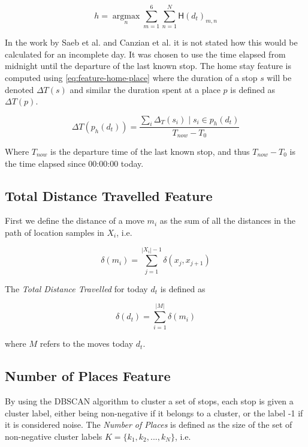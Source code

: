 \begin{equation}
\label{eq:feature-home-place}
h = \operatorname*{argmax}_n \sum_{m=1}^{6} \sum_{n=1}^{N}  \mathsf{H}(d_t)_{m,n}
\end{equation}

In the work by Saeb et al. \cite{Saeb2015} and Canzian et al.\cite{Canzian2015} it is not stated how this would be calculated for an incomplete day. It was chosen to  use the time elapsed from midnight until the departure of the last known stop. The home stay feature is computed using \eqref{eq:feature-home-place} where the duration of a stop $s$ will be denoted $\Delta T (s)$ and similar the duration spent at a place $p$ is defined as $\Delta T (p)$.

\begin{equation}
\label{eq:feature-home-place}
\Delta T(p_{h} (d_t) )= \frac{\sum_i \Delta_T (s_i) \;|\; s_i \in p_h (d_t)}{T_{now} - T_{0}}
\end{equation}

Where $T_{now}$ is the departure time of the last known stop, and thus $T_{now} - T_0$ is the time elapsed since 00:00:00 today.

\subsection{Total Distance Travelled Feature}
First we define the distance of a move $m_i$ as the sum of all the distances in the path of location samples in $X_i$, i.e.

\begin{equation}
\label{eq:feature-move-computation}
\delta (m_i)  = \sum_{j=1}^{|X_i|-1} \delta (x_j, x_{j+1})
\end{equation}

The \textit{Total Distance Travelled} for today $d_t$ is defined as 

\begin{equation}
\label{eq:feature-total-distance}
\delta (d_t) = \sum_{i=1}^{|M|} \delta (m_i)
\end{equation}

where $M$ refers to the moves today $d_t$.

\subsection{Number of Places Feature}
By using the DBSCAN algorithm to cluster a set of stops, each stop is given a cluster label, either being non-negative if it belongs to a cluster, or the label -1 if it is considered noise. The \textit{Number of Places} is defined as the size of the set of non-negative cluster labels $K = \{k_1, k_2, ..., k_N\}$, i.e.


